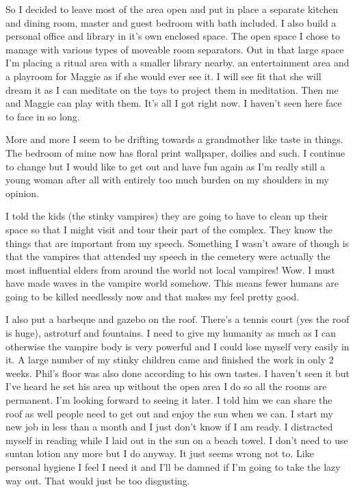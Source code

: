 So I decided to leave most of the area open and put in place a separate kitchen and dining room, master and guest bedroom with bath included. I also build a personal office and library in it's own enclosed space. The open space I chose to manage with various types of moveable room separators. Out in that large space I'm placing a ritual area with a smaller library nearby. an entertainment area and a playroom for Maggie as if she would ever see it. I will see fit that she will dream it as I can meditate on the toys to project them in meditation. Then me and Maggie can play with them. It's all I got right now. I haven't seen here face to face in so long.

More and more I seem to be drifting towards a grandmother like taste in things. The bedroom of mine now has floral print wallpaper, doilies and such. I continue to change but I would like to get out and have fun again as I'm really still a young woman after all with entirely too much burden on my shoulders in my opinion.

I told the kids (the stinky vampires) they are going to have to clean up their space so that I might visit and tour their part of the complex. They know the things that are important from my speech. Something I wasn't aware of though is that the vampires that attended my speech in the cemetery were actually the most influential elders from around the world not local vampires! Wow. I must have made waves in the vampire world somehow. This means fewer humans are going to be killed needlessly now and that makes my feel pretty good.

I also put a barbeque and gazebo on the roof. There's a tennis court (yes the roof is huge), astroturf and fountains. I need to give my humanity as much as I can otherwise the vampire body is very powerful and I could lose myself very easily in it.
A large number of my stinky children came and finished the work in only 2 weeks. Phil's floor was also done according to his own tastes. I haven't seen it but I've heard he set his area up without the open area I do so all the rooms are permanent. I'm looking forward to seeing it later. I told him we can share the roof as well people need to get out and enjoy the sun when we can.
I start my new job in less than a month and I just don't know if I am ready. I distracted myself in reading while I laid out in the sun on a beach towel. I don't need to use suntan lotion any more but I do anyway. It just seems wrong not to. Like personal hygiene I feel I need it and I'll be damned if I'm going to take the lazy way out. That would just be too disgusting.

